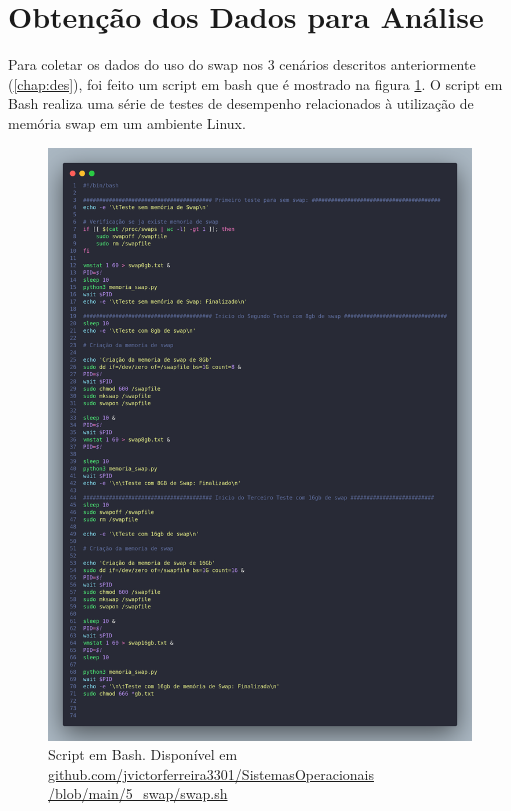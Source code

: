 \documentclass[
	12pt,				%
	openright,			%
	oneside,			%
	a4paper,			%
	chapter=TITLE,		%
	english,			%
	french,				%
	spanish,			%
	brazil				%
	]{abntex2}
\theoremstyle{definition}
\begin{document}
\section{Obtenção dos Dados para Análise}

Para coletar os dados do uso do swap nos 3 cenários descritos anteriormente (\ref{chap:des}), foi feito um script em bash que é mostrado na figura \ref{fig:swapy}. 
O script em Bash realiza uma série de testes de desempenho relacionados à utilização de memória 
swap em um ambiente Linux.

\begin{figure}[H]
	\centering
	\includegraphics[width=1.0\textwidth]{bash.png}
	\caption{Script em Bash. Disponível em \href{https://github.com/jvictorferreira3301/Sistemas_Operacionais/blob/main/5_swap/swap.sh}{github.com/jvictorferreira3301/SistemasOperacionais
	/blob/main/5\_swap/swap.sh}}
	\label{fig:swapy}
\end{figure}
\end{document}
